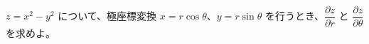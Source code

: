 
$z = x^{2} - y^{2}$ について、極座標変換 $x = r\cos\theta$、$y = r\sin\theta$ を行うとき、$\dfrac{\partial z}{\partial r}$ と $\dfrac{\partial z}{\partial \theta}$ を求めよ。
